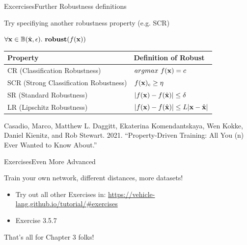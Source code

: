 \documentclass[t,compress,aspectratio=169]{beamer}
\begin{document}
\begin{frame}{Excercises}{Further Robustness definitions}
\vspace{-2em}

\begin{block}{Try specifiying another robustness property (e.g. SCR)}
\end{block}
\vspace{-1em}
$\forall \mathbf{x} \in \mathbb{B}(\hat{\mathbf{x}}, \epsilon). \ \textbf{robust}(f(\mathbf{x}))$

\begin{center}

\begin{tabular}{l|l}
		\toprule
		 \textbf{Property} & \textbf{Definition of Robust}  \\
		\midrule \midrule
		   CR (Classification Robustness) & $argmax\ f(\mathbf{x}) = c$ \\
		\midrule
		 SCR (Strong Classification Robustness) & $f(\mathbf{x})_c \geq \eta$  \\
		\midrule
		 SR (Standard Robustness) &	$|f(\mathbf{x}) - f(\hat{\mathbf{x}})| \leq \delta$ \\
		\midrule
         LR (Lipschitz Robustness) & $|f(\mathbf{x}) - f(\hat{\mathbf{x}})| \leq L|\mathbf{x}-\hat{\mathbf{x}}|$  \\
		\bottomrule
\end{tabular}
\end{center}
\footnotesize{Casadio, Marco, Matthew L. Daggitt, Ekaterina Komendantskaya, Wen Kokke, Daniel Kienitz, and Rob Stewart. 2021. “Property-Driven Training: All You (n) Ever Wanted to Know About.” }

\end{frame}




\begin{frame}{Exercises}{Even More Advanced}

\begin{block}{Train your own network, different distances, more datasets!}

\begin{itemize}
\item Try  out all other Exercises in:
\url{https://vehicle-lang.github.io/tutorial/\#exercises}
\item \textcolor{aisecred}{Exercise 3.5.7}
\end{itemize}
\end{block}
\vspace{2em}
\begin{center}
    \huge{\textcolor{aisecred}{That's all for Chapter 3 folks!}}
\end{center}

\end{frame}
\end{document}
